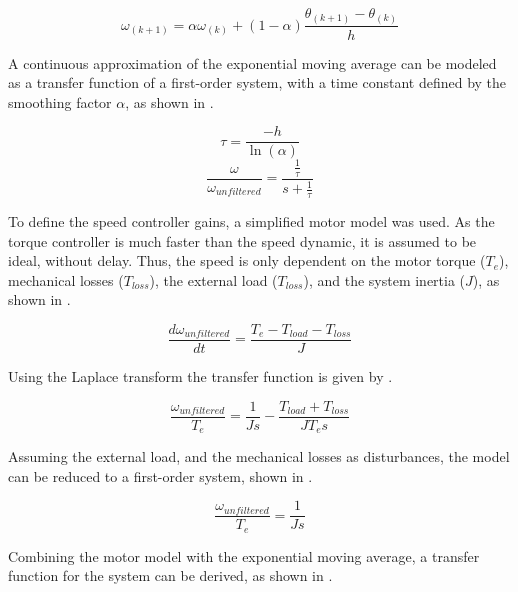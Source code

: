 \begin{equation}
	\omega_{(k+1)} = \alpha \omega_{(k)} + (1-\alpha) \frac{\theta_{(k+1)} - \theta_{(k)}}{h}
	\label{eq:rotor_speed}
\end{equation}

A continuous approximation of the exponential moving average can be modeled as a transfer function of a first-order system, with a time constant defined by the smoothing factor $\alpha$, as shown in .


\begin{equation}
	\tau = \frac{-h}{\ln(\alpha)}
	\label{eq:time_constant}
\end{equation}
\begin{equation}
		\frac{\omega}{\omega_{unfiltered}} = \frac{\frac{1}{\tau}}{s+\frac{1}{\tau}}
	\label{eq:exp_moving_average}
\end{equation}

To define the speed controller gains, a simplified motor model was used. As the torque controller is much faster than the speed dynamic, it is assumed to be ideal, without delay. Thus, the speed is only dependent on the motor torque ($T_{e}$), mechanical losses ($T_{loss}$), the external load ($T_{loss}$), and the system inertia ($J$), as shown in .

\begin{equation}
		\frac{d\omega_{unfiltered}}{dt} = \frac{T_e-T_{load} - T_{loss}}{J}
	\label{eq:speed_model}
\end{equation}

Using the Laplace transform the transfer function is given by .

\begin{equation}
		\frac{\omega_{unfiltered}}{T_e} = \frac{1}{J s}-\frac{T_{load} + T_{loss}}{J T_e s}
	\label{eq:speed_tf}
\end{equation}

Assuming the external load, and the mechanical losses as disturbances, the model can be reduced to a first-order system, shown in .

\begin{equation}
		\frac{\omega_{unfiltered}}{T_e} = \frac{1}{J s}
	\label{eq:speed_tf_reduced}
\end{equation}

Combining the motor model with the exponential moving average, a transfer function for the system can be derived, as shown in .

